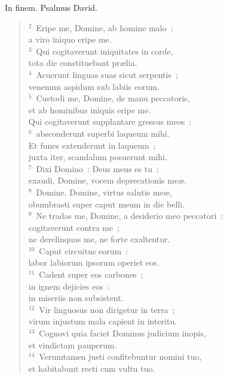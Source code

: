 \lettrine[lines=3,image=true,loversize=0.05,lraise=-0.03]{I}{}n finem. Psalmus David.
\begin{flushleft}\begin{verse}\vspace{6pt}${}^{2}$~Eripe me, Domine, ab homine malo~;\\ a viro iniquo eripe me.\\
${}^{3}$~Qui cogitaverunt iniquitates in corde,\\ tota die constituebant pr\ae lia.\\
${}^{4}$~Acuerunt linguas suas sicut serpentis~;\\ venenum aspidum sub labiis eorum.\\
${}^{5}$~Custodi me, Domine, de manu peccatoris,\\ et ab hominibus iniquis eripe me.\\ Qui cogitaverunt supplantare gressus meos~:\\
${}^{6}$~absconderunt superbi laqueum mihi.\\ Et funes extenderunt in laqueum~;\\ juxta iter, scandalum posuerunt mihi.\\
${}^{7}$~Dixi Domino~: Deus meus es tu~;\\ exaudi, Domine, vocem deprecationis me\ae .\\
${}^{8}$~Domine, Domine, virtus salutis me\ae ,\\ obumbrasti super caput meum in die belli.\\
${}^{9}$~Ne tradas me, Domine, a desiderio meo peccatori~:\\ cogitaverunt contra me~;\\ ne derelinquas me, ne forte exaltentur.\\
${}^{10}$~Caput circuitus eorum~:\\ labor labiorum ipsorum operiet eos.\\
${}^{11}$~Cadent super eos carbones~;\\ in ignem dejicies eos~:\\ in miseriis non subsistent.\\
${}^{12}$~Vir linguosus non dirigetur in terra~;\\ virum injustum mala capient in interitu.\\
${}^{13}$~Cognovi quia faciet Dominus judicium inopis,\\ et vindictam pauperum.\\
${}^{14}$~Verumtamen justi confitebuntur nomini tuo,\\ et habitabunt recti cum vultu tuo.\end{verse}\end{flushleft}




